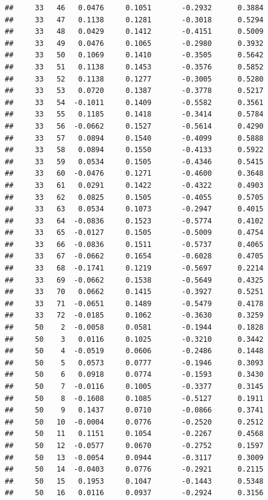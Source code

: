 \documentclass[
]{article}
\begin{document}
\begin{verbatim}
##     33   46   0.0476     0.1051       -0.2932      0.3884 
##     33   47   0.1138     0.1281       -0.3018      0.5294 
##     33   48   0.0429     0.1412       -0.4151      0.5009 
##     33   49   0.0476     0.1065       -0.2980      0.3932 
##     33   50   0.1069     0.1410       -0.3505      0.5642 
##     33   51   0.1138     0.1453       -0.3576      0.5852 
##     33   52   0.1138     0.1277       -0.3005      0.5280 
##     33   53   0.0720     0.1387       -0.3778      0.5217 
##     33   54  -0.1011     0.1409       -0.5582      0.3561 
##     33   55   0.1185     0.1418       -0.3414      0.5784 
##     33   56  -0.0662     0.1527       -0.5614      0.4290 
##     33   57   0.0894     0.1540       -0.4099      0.5888 
##     33   58   0.0894     0.1550       -0.4133      0.5922 
##     33   59   0.0534     0.1505       -0.4346      0.5415 
##     33   60  -0.0476     0.1271       -0.4600      0.3648 
##     33   61   0.0291     0.1422       -0.4322      0.4903 
##     33   62   0.0825     0.1505       -0.4055      0.5705 
##     33   63   0.0534     0.1073       -0.2947      0.4015 
##     33   64  -0.0836     0.1523       -0.5774      0.4102 
##     33   65  -0.0127     0.1505       -0.5009      0.4754 
##     33   66  -0.0836     0.1511       -0.5737      0.4065 
##     33   67  -0.0662     0.1654       -0.6028      0.4705 
##     33   68  -0.1741     0.1219       -0.5697      0.2214 
##     33   69  -0.0662     0.1538       -0.5649      0.4325 
##     33   70   0.0662     0.1415       -0.3927      0.5251 
##     33   71  -0.0651     0.1489       -0.5479      0.4178 
##     33   72  -0.0185     0.1062       -0.3630      0.3259 
##     50    2  -0.0058     0.0581       -0.1944      0.1828 
##     50    3   0.0116     0.1025       -0.3210      0.3442 
##     50    4  -0.0519     0.0606       -0.2486      0.1448 
##     50    5   0.0573     0.0777       -0.1946      0.3093 
##     50    6   0.0918     0.0774       -0.1593      0.3430 
##     50    7  -0.0116     0.1005       -0.3377      0.3145 
##     50    8  -0.1608     0.1085       -0.5127      0.1911 
##     50    9   0.1437     0.0710       -0.0866      0.3741 
##     50   10  -0.0004     0.0776       -0.2520      0.2512 
##     50   11   0.1151     0.1054       -0.2267      0.4568 
##     50   12  -0.0577     0.0670       -0.2752      0.1597 
##     50   13  -0.0054     0.0944       -0.3117      0.3009 
##     50   14  -0.0403     0.0776       -0.2921      0.2115 
##     50   15   0.1953     0.1047       -0.1443      0.5348 
##     50   16   0.0116     0.0937       -0.2924      0.3156 

\end{verbatim}
\end{document}
